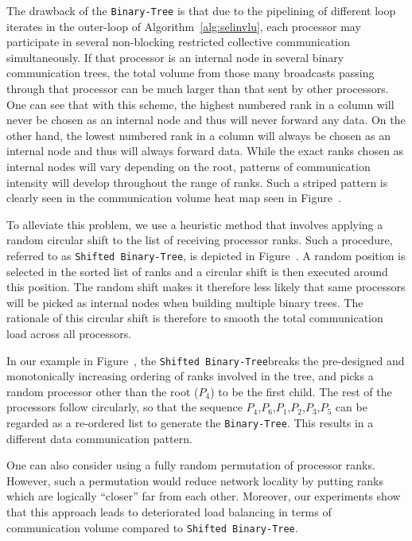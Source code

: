 \documentclass{acm_proc_article-sp}
\newcommand{\btree}{\texttt{Binary-Tree}\xspace}
\newcommand{\modbtree}{\texttt{Shifted Binary-Tree}\xspace}
\begin{document}
The drawback of the \btree is that due to the pipelining of different loop iterates in the 
outer-loop of Algorithm~\ref{alg:selinvlu}, each processor may participate 
in several non-blocking restricted collective communication simultaneously. If
that processor is an internal node in several binary communication trees,
the total volume from those many broadcasts passing through that processor can be 
much larger than that sent by other processors.
One can see that with this scheme, the highest numbered rank in a 
column will never be chosen as an internal node and thus will 
never forward any data.
On the other hand, the lowest numbered
rank in a column will always be chosen as an internal node and thus
will always forward data.  While the exact ranks chosen as internal
nodes will vary depending on the root, patterns of communication 
intensity will develop throughout the range of ranks.  Such a 
striped pattern is clearly seen in the communication volume heat map seen in 
Figure~. 



To alleviate this problem, we use a heuristic method that involves
applying a random circular shift to the list of receiving processor ranks.
Such a procedure, referred to as \modbtree, is depicted in 
Figure~. A random position is selected in
the sorted list of ranks and a circular shift is then executed around this position.
The random shift makes it therefore less likely that same processors
will be picked as internal nodes when building multiple binary trees. The
rationale of this circular shift is therefore to smooth the total communication
load across all processors. 


In our example in Figure~, the
\modbtree \linebreak breaks the pre-designed and monotonically increasing ordering 
of ranks involved in the tree,
and picks a random processor
other than the root ($P_{4}$) to be the first child.  The rest of the
processors follow circularly, so that the sequence
$P_{4}$,$P_{6}$,$P_{1}$,$P_{2}$,$P_{3}$,$P_{5}$ can be regarded as a re-ordered
list to generate the \btree. 
This results in a different data communication pattern.

One can also consider using a fully random permutation of processor ranks. However,
such a permutation would reduce network locality by putting ranks which are logically
``closer'' far from each other. Moreover, our experiments show that this
approach leads to deteriorated load balancing in terms of communication
volume compared to \modbtree.
\end{document}
